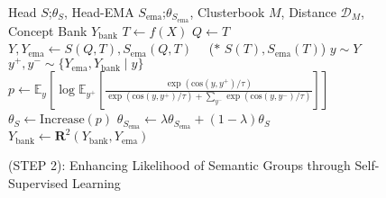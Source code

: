 \documentclass{article} \usepackage{iclr2024_conference,times}
\begin{document}
\begin{figure}[t!]
\vspace{-12mm}
\begin{algorithm}[H]
\caption{(STEP 2): Enhancing Likelihood of Semantic Groups through Self-Supervised Learning}
\begin{algorithmic}[1]
\Require Head $S$;$\theta_S$, Head-EMA $S_{\text{ema}}$;$\theta_{S_\text{ema}}$, Clusterbook $M$, Distance $\mathcal{D}_M$, Concept Bank $Y_{\text{bank}}$
\State $T \gets f(X)$ 
\State $Q \gets T$ 
\State $Y, Y_{\text{ema}}\gets S(Q, T), S_{\text{ema}}(Q, T)\quad$ ({\large $\ast$}  $S(T), S_{\text{ema}}(T)$) 
\State $y \sim Y$ 
\State $y^+, y^- \sim \{Y_{\text{ema}}, Y_{\text{bank}}\mid y\}$ 
\State $p \gets \mathbb{E}_{y}\left[\log\mathbb{E}_{y^{+}}\left[\frac{\exp(\text{cos}(y, y^{+}) / \tau)}{\exp(\text{cos}(y, y^{+})/\tau) + \sum_{y^{-}} \exp(\text{cos}(y, y^{-}) / \tau)}\right]\right]$ 
\State $\theta_S \gets \text{Increase}(p)$ 
\State $\theta_{S_{\text{ema}}} \gets \lambda\theta_{S_{\text{ema}}} + (1-\lambda)\theta_{S}$ 
\State $Y_{\text{bank}} \gets \textbf{R}^{2}(Y_{\text{bank}}, Y_{\text{ema}})$ 
\EndFor
\end{algorithmic}
\label{alg:contrastive}
\end{algorithm}
\vspace{-7mm}
\end{figure} 
\end{document}
